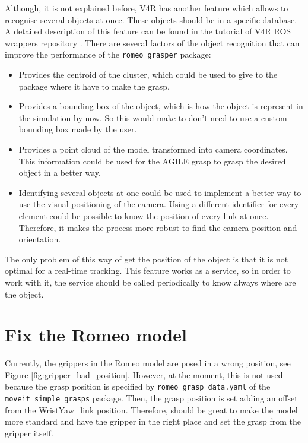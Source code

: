 \documentclass[12pt,a4paper,final,twoside,openright]{report}
\begin{document}
Although, it is not explained before, V4R has another feature which allows to recognise several objects at once. These objects should be in a specific database. A detailed description of this feature can be found in the tutorial of V4R ROS wrappers repository \cite{gitV4RWrappers}. There are several factors of the object recognition that can improve the performance of the \texttt{romeo\_grasper} package:

\begin{itemize}
\item Provides the centroid of the cluster, which could be used to give to the package where it have to make the grasp.
\item Provides a bounding box of the object, which is how the object is represent in the simulation by now. So this would make to don't need to use a custom bounding box made by the user.
\item Provides a point cloud of the model transformed into camera coordinates. This information could be used for the AGILE grasp to grasp the desired object in a better way.
\item Identifying several objects at one could be used to implement a better way to use the visual positioning of the camera. Using a different identifier for every element could be possible to know the position of every link at once. Therefore, it makes the process more robust to find the camera position and orientation. 
\end{itemize}

The only problem of this way of get the position of the object is that it is not optimal for a real-time tracking. This feature works as a service, so in order to work with it, the service should be called periodically to know always where are the object.

\section{Fix the Romeo model}

Currently, the grippers in the Romeo model are posed in a wrong position, see Figure \ref{fig:gripper_bad_position}. However, at the moment, this is not used because the grasp position is specified by \texttt{romeo\_grasp\_data.yaml} of the \texttt{moveit\_simple\_grasps} package. Then, the grasp position is set adding an offset from the WristYaw\_link position. Therefore, should be great to make the model more standard and have the gripper in the right place and set the grasp from the gripper itself. 
\end{document}
